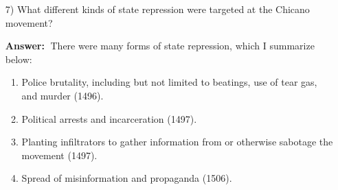 \documentclass{article}
\newcommand{\answer}{\textbf{Answer:}$\;$}
\begin{document}
\begin{enumerate}
    \item[7)] What different kinds of state repression were targeted at the Chicano movement?
    
    \answer
    There were many forms of state repression, which I summarize below:
    \begin{enumerate}
        \item Police brutality, including but not limited to beatings, use of tear gas, and murder (1496).
        \item Political arrests and incarceration (1497).
        \item Planting infiltrators to gather information from or otherwise sabotage the movement (1497).
        \item Spread of misinformation and propaganda (1506).
    \end{enumerate}
    
\end{enumerate}
 
\end{document}
